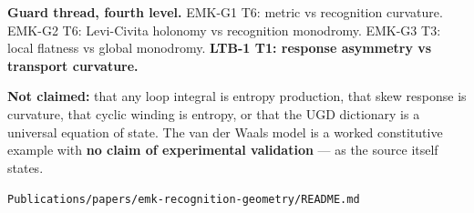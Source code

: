 \textbf{Guard thread, fourth level.} EMK-G1 T6: metric vs recognition
curvature. EMK-G2 T6: Levi-Civita holonomy vs recognition monodromy.
EMK-G3 T3: local flatness vs global monodromy. \textbf{LTB-1 T1: response
asymmetry vs transport curvature.}

\textbf{Not claimed:} that any loop integral is entropy production, that skew
response is curvature, that cyclic winding is entropy, or that the UGD
dictionary is a universal equation of state. The van der Waals model is
a worked constitutive example with \textbf{no claim of experimental
validation} --- as the source itself states.

\begin{flushright}\small\texttt{Publications/papers/emk-recognition-geometry/README.md}\end{flushright}
